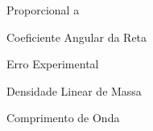 \thispagestyle{empty} 

\begin{simbolos}
  \item[$\propto $] Proporcional a
  \item[$\alpha $] Coeficiente Angular da Reta
  \item[$\delta $] Erro Experimental
  \item[$\mu $] Densidade Linear de Massa
  \item[$\lambda $] Comprimento de Onda
\end{simbolos}
